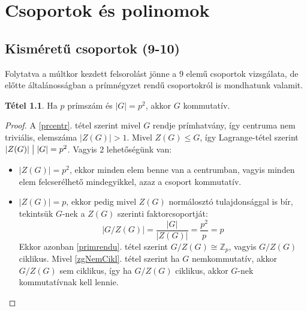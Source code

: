 \documentclass[12pt]{book}
\theoremstyle{plain} %
\theoremstyle{definition} %
\newtheorem{theo/}{Tétel}[section]
\newenvironment{theo}
  {\renewcommand{\qedsymbol}{$\clubsuit$}%
   \pushQED{\qed}\begin{theo/}}
  {\popQED\end{theo/}}
\theoremstyle{remark}
\renewcommand\qedsymbol{$\blacksquare$}
\numberwithin{equation}{section}  %
\def\Z{\mathbb{Z}}
\begin{document}
	

	\chapter{Csoportok és polinomok}
	\section{Kisméretű csoportok (9-10)}
	
	Folytatva a múltkor kezdett felsorolást jönne a $9$ elemű csoportok vizsgálata, de előtte általánosságban a prímnégyzet rendű csoportokról is mondhatunk valamit.
	
	\begin{theo}
		Ha $p$ prímszám és $|G| = p^2$, akkor $G$ kommutatív.
	\end{theo}

	\begin{proof}
		A \ref{prcentr}. tétel szerint mivel $G$ rendje prímhatvány, így centruma nem triviális, elemszáma $|Z(G)|>1$. Mivel $Z(G)\leq G$, így Lagrange-tétel szerint $|Z(G)| \bigm | |G| = p^2$. Vagyis $2$ lehetőségünk van:
		\begin{itemize}
			\item $|Z(G)| = p^2$, ekkor minden elem benne van a centrumban, vagyis minden elem felcserélhető mindegyikkel, azaz a csoport kommutatív.
			\item $|Z(G)| = p$, ekkor pedig mivel $Z(G)$ normálosztó tulajdonsággal is bír, tekintsük $G$-nek a $Z(G)$ szerinti faktorcsoportját:
			\[ |G/Z(G)| = \dfrac{|G|}{|Z(G)|} = \dfrac{p^2}{p} = p  \]
			Ekkor azonban \ref{primrendu}. tétel szerint $G/Z(G) \cong \Z_p$, vagyis $G/Z(G)$ ciklikus. Mivel \ref{zgNemCikl}. tétel szerint ha $G$ nemkommutatív, akkor $G/Z(G)$ sem ciklikus, így ha $G/Z(G)$ ciklikus, akkor $G$-nek kommutatívnak kell lennie.
		\end{itemize}
	\end{proof}
\end{document}
